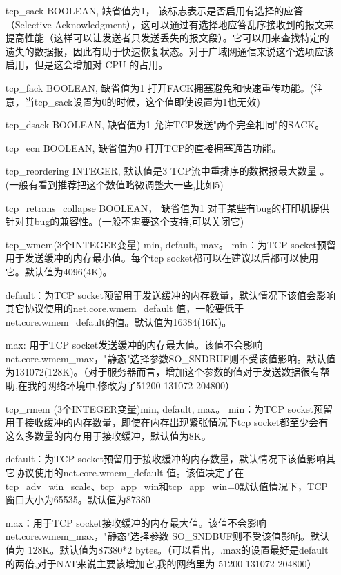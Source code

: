 \begin{enumerate}
\item[tcp\_sack] BOOLEAN,
				缺省值为1，
				该标志表示是否启用有选择的应答（Selective Acknowledgment），这可以通过有选择地应答乱序接收到的报文来提高性能（这样可以让发送者只发送丢失的报文段）。它可以用来查找特定的遗失的数据报，因此有助于快速恢复状态。对于广域网通信来说这个选项应该启用，但是这会增加对 CPU 的占用。

\item[tcp\_fack] BOOLEAN,
缺省值为1
打开FACK拥塞避免和快速重传功能。(注意，当tcp\_sack设置为0的时候，这个值即使设置为1也无效)

\item[tcp\_dsack] BOOLEAN,
缺省值为1
允许TCP发送"两个完全相同"的SACK。

\item[tcp\_ecn] BOOLEAN,
缺省值为0
打开TCP的直接拥塞通告功能。

\item[tcp\_reordering] INTEGER,
默认值是3
TCP流中重排序的数据报最大数量 。 (一般有看到推荐把这个数值略微调整大一些,比如5)

\item[tcp\_retrans\_collapse] BOOLEAN，
缺省值为1
对于某些有bug的打印机提供针对其bug的兼容性。(一般不需要这个支持,可以关闭它)

\item[tcp\_wmem(3个INTEGER变量)] min, default, max。
min：为TCP socket预留用于发送缓冲的内存最小值。每个tcp socket都可以在建议以后都可以使用它。默认值为4096(4K)。

default：为TCP socket预留用于发送缓冲的内存数量，默认情况下该值会影响其它协议使用的net.core.wmem\_default 值，一般要低于net.core.wmem\_default的值。默认值为16384(16K)。

max: 用于TCP socket发送缓冲的内存最大值。该值不会影响net.core.wmem\_max，"静态"选择参数SO\_SNDBUF则不受该值影响。默认值为131072(128K)。（对于服务器而言，增加这个参数的值对于发送数据很有帮助,在我的网络环境中,修改为了51200 131072 204800）

\item[tcp\_rmem ] (3个INTEGER变量)min, default, max。
min：为TCP socket预留用于接收缓冲的内存数量，即使在内存出现紧张情况下tcp socket都至少会有这么多数量的内存用于接收缓冲，默认值为8K。

default：为TCP socket预留用于接收缓冲的内存数量，默认情况下该值影响其它协议使用的net.core.wmem\_default 值。该值决定了在tcp\_adv\_win\_scale、tcp\_app\_win和tcp\_app\_win=0默认值情况下，TCP窗口大小为65535。默认值为87380

max：用于TCP socket接收缓冲的内存最大值。该值不会影响 net.core.wmem\_max，"静态"选择参数 SO\_SNDBUF则不受该值影响。默认值为 128K。默认值为87380*2 bytes。（可以看出，.max的设置最好是default的两倍,对于NAT来说主要该增加它,我的网络里为 51200 131072 204800）


\end{enumerate}
